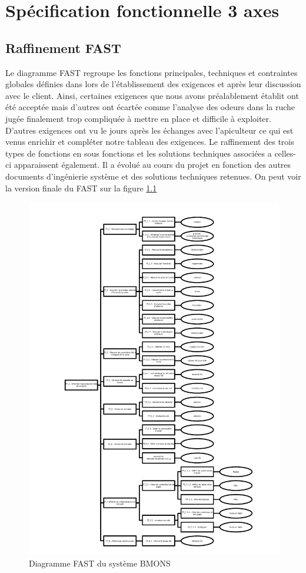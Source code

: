 \chapter{Spécification fonctionnelle  3 axes}

\section{Raffinement FAST}
Le diagramme FAST regroupe les fonctions principales, techniques et contraintes globales définies dans lors de 
l'établissement des exigences et après leur discussion avec le client. Ainsi, certaines exigences que nous avons préalablement établit ont été acceptée mais d'autres ont écartée comme l'analyse des odeurs dans la ruche jugée finalement trop compliquée à mettre en place et difficile à exploiter. D'autres exigences ont vu le jours après les échanges avec l'apiculteur ce qui est venus enrichir et compléter notre tableau des exigences. Le raffinement des trois types de fonctions en sous fonctions et les solutions techniques 
associées a celles-ci apparaissent également. Il a évolué au cours du projet en fonction des autres documents 
d'ingénierie système et des solutions techniques retenues. 
On peut voir la version finale du FAST sur la figure \ref{fig:fast}

\begin{figure}[h!]
\centering\includegraphics[scale=0.8]{FAST_BMONS.pdf}
\caption{\label{fig:fast} Diagramme FAST du système BMONS}
\end{figure}

